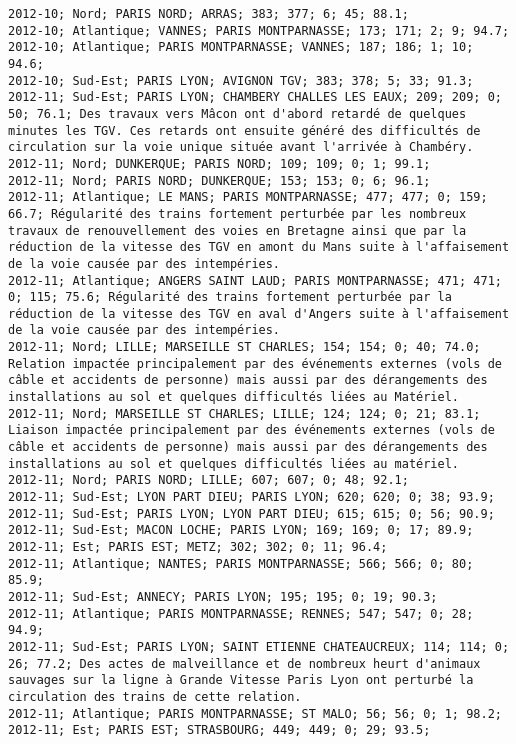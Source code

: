 \documentclass{article}
\begin{document}
\begin{Verbatim}[commandchars=\\\{\}]
2012-10; Nord; PARIS NORD; ARRAS; 383; 377; 6; 45; 88.1; 
2012-10; Atlantique; VANNES; PARIS MONTPARNASSE; 173; 171; 2; 9; 94.7; 
2012-10; Atlantique; PARIS MONTPARNASSE; VANNES; 187; 186; 1; 10; 94.6; 
2012-10; Sud-Est; PARIS LYON; AVIGNON TGV; 383; 378; 5; 33; 91.3; 
2012-11; Sud-Est; PARIS LYON; CHAMBERY CHALLES LES EAUX; 209; 209; 0; 50; 76.1; Des travaux vers Mâcon ont d'abord retardé de quelques minutes les TGV. Ces retards ont ensuite généré des difficultés de circulation sur la voie unique située avant l'arrivée à Chambéry.
2012-11; Nord; DUNKERQUE; PARIS NORD; 109; 109; 0; 1; 99.1; 
2012-11; Nord; PARIS NORD; DUNKERQUE; 153; 153; 0; 6; 96.1; 
2012-11; Atlantique; LE MANS; PARIS MONTPARNASSE; 477; 477; 0; 159; 66.7; Régularité des trains fortement perturbée par les nombreux travaux de renouvellement des voies en Bretagne ainsi que par la réduction de la vitesse des TGV en amont du Mans suite à l'affaisement de la voie causée par des intempéries.
2012-11; Atlantique; ANGERS SAINT LAUD; PARIS MONTPARNASSE; 471; 471; 0; 115; 75.6; Régularité des trains fortement perturbée par la réduction de la vitesse des TGV en aval d'Angers suite à l'affaisement de la voie causée par des intempéries.
2012-11; Nord; LILLE; MARSEILLE ST CHARLES; 154; 154; 0; 40; 74.0; Relation impactée principalement par des événements externes (vols de câble et accidents de personne) mais aussi par des dérangements des installations au sol et quelques difficultés liées au Matériel.
2012-11; Nord; MARSEILLE ST CHARLES; LILLE; 124; 124; 0; 21; 83.1; Liaison impactée principalement par des événements externes (vols de câble et accidents de personne) mais aussi par des dérangements des installations au sol et quelques difficultés liées au matériel.
2012-11; Nord; PARIS NORD; LILLE; 607; 607; 0; 48; 92.1; 
2012-11; Sud-Est; LYON PART DIEU; PARIS LYON; 620; 620; 0; 38; 93.9; 
2012-11; Sud-Est; PARIS LYON; LYON PART DIEU; 615; 615; 0; 56; 90.9; 
2012-11; Sud-Est; MACON LOCHE; PARIS LYON; 169; 169; 0; 17; 89.9; 
2012-11; Est; PARIS EST; METZ; 302; 302; 0; 11; 96.4; 
2012-11; Atlantique; NANTES; PARIS MONTPARNASSE; 566; 566; 0; 80; 85.9; 
2012-11; Sud-Est; ANNECY; PARIS LYON; 195; 195; 0; 19; 90.3; 
2012-11; Atlantique; PARIS MONTPARNASSE; RENNES; 547; 547; 0; 28; 94.9; 
2012-11; Sud-Est; PARIS LYON; SAINT ETIENNE CHATEAUCREUX; 114; 114; 0; 26; 77.2; Des actes de malveillance et de nombreux heurt d'animaux sauvages sur la ligne à Grande Vitesse Paris Lyon ont perturbé la circulation des trains de cette relation.
2012-11; Atlantique; PARIS MONTPARNASSE; ST MALO; 56; 56; 0; 1; 98.2; 
2012-11; Est; PARIS EST; STRASBOURG; 449; 449; 0; 29; 93.5; 

\end{Verbatim}
\end{document}
